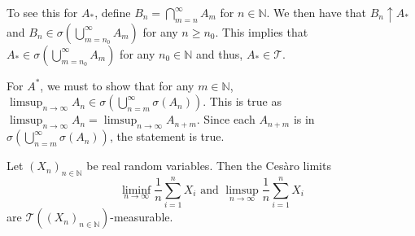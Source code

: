 \vspace{0.75mm}
To see this for $A_*$, define $B_n=\bigcap_{m=n}^\infty A_m$ for $n\in\mathbb{N}$. We then have that $B_n\uparrow A_*$ and $B_n\in\sigma(\bigcup_{m=n_0}^\infty A_m)$ for any $n\geq n_0$. This implies that $A_*\in\sigma(\bigcup_{m=n_0}^\infty A_m)$ for any $n_0\in\mathbb{N}$ and thus, $A_*\in\mathcal{T}$.

\vspace{0.75mm}
For $A^*$, we must to show that for any $m\in\mathbb{N}$, $\limsup_{n\to\infty}A_n \in \sigma(\bigcup_{n=m}^\infty \sigma(A_n))$. This is true as $\limsup_{n\to\infty}A_n=\limsup_{n\to\infty}A_{n+m}$. Since each $A_{n+m}$ is in $\sigma(\bigcup_{n=m}^\infty \sigma(A_{n}))$, the statement is true.

\vspace{2mm}
Let $(X_n)_{n\in\mathbb{N}}$ be real random variables. Then the Ces\`{a}ro limits
$$\liminf_{n\to\infty} \frac{1}{n}\sum_{i=1}^n X_i\text{ and }\limsup_{n\to\infty} \frac{1}{n}\sum_{i=1}^n X_i$$
are $\mathcal{T}((X_n)_{n\in\mathbb{N}})$-measurable.


